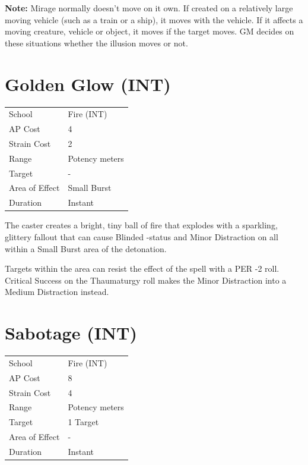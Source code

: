\documentclass[11pt,a4paper,twocolumn]{book}
\begin{document}
	\textbf{Note:} Mirage normally doesn't move on it own. If created on a relatively large moving vehicle (such as a train or a ship), it moves with the vehicle. If it affects a moving creature, vehicle or object, it moves if the target moves. GM decides on these situations whether the illusion moves or not.
	
		\section*{Golden Glow (INT)}
	{
		\begin{tabu} to 75mm{| X[l,4] | X[l,7] |}
			\hline
			School 			&  Fire (INT)			\\
			AP Cost	      	&  4					\\
			Strain Cost     &  2					\\
			Range     		&  Potency meters		\\
			Target      	&  -					\\
			Area of Effect  &  Small Burst	 		\\
			Duration     	&  Instant				\\ \hline
		\end{tabu}
		
	}
	
	\medskip
	
	The caster creates a bright, tiny ball of fire that explodes with a sparkling, glittery fallout that can cause Blinded -status and Minor Distraction on all within a Small Burst area of the detonation.
	
	Targets within the area can resist the effect of the spell with a PER -2 roll. Critical Success on the Thaumaturgy roll makes the Minor Distraction into a Medium Distraction instead.
	
		\section*{Sabotage (INT)}
	{
		\begin{tabu} to 75mm{| X[l,4] | X[l,7] |}
			\hline
			School 			&  Fire (INT)			\\
			AP Cost	      	&  8					\\
			Strain Cost     &  4					\\
			Range     		&  Potency meters		\\
			Target      	&  1 Target				\\
			Area of Effect  &  -	 				\\
			Duration     	&  Instant				\\ \hline
		\end{tabu}
		
	}
	
\end{document}
